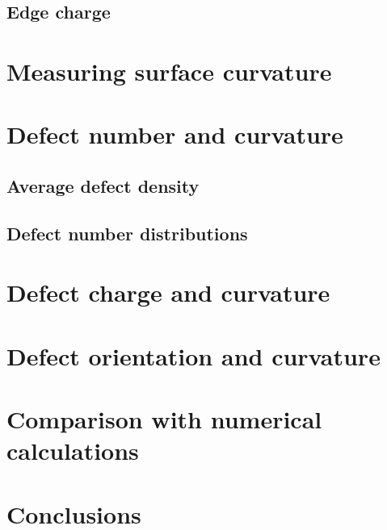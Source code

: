 \subsection{Edge charge}

\section{Measuring surface curvature}

\section{Defect number and curvature}
\subsection{Average defect density}
\subsection{Defect number distributions}

\section{Defect charge and curvature}

\section{Defect orientation and curvature}

\section{Comparison with numerical calculations}

\section{Conclusions}
